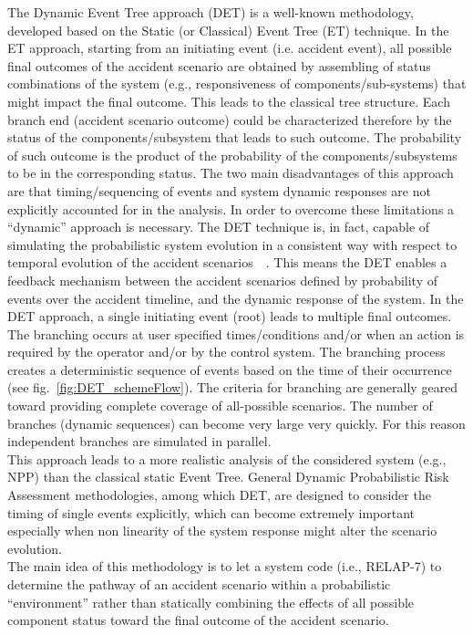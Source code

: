 \label{sec:det}
The Dynamic Event Tree approach (DET) is a well-known methodology, developed based on the Static (or Classical) Event Tree (ET) technique. In the ET approach, starting from an initiating event (i.e. accident event), all possible final outcomes of the accident scenario are obtained by assembling of status combinations of the system (e.g., responsiveness of components/sub-systems) that might impact the final outcome. This leads to the classical tree structure. Each branch end (accident scenario outcome) could be characterized therefore by the status of the components/subsystem that leads to such outcome. The probability of such outcome is the product of the probability of the components/subsystems to be in the corresponding status. The two main disadvantages of this approach are that timing/sequencing of events and system dynamic responses are not explicitly accounted for in the analysis.  
In order to overcome these limitations a “dynamic” approach is necessary. The DET technique is, in fact, capable of simulating the probabilistic system evolution in a consistent way with respect to temporal evolution of the accident scenarios~\cite{alfonsiPSA}~\cite{ADAPTHakobyan}. This means the DET enables a feedback mechanism between the accident scenarios defined by probability of events over the accident timeline, and the dynamic response of the system. In the DET approach, a single initiating event (root) leads to multiple final outcomes. The branching occurs at user specified times/conditions and/or when an action is required by the operator and/or by the control system. The branching process creates a deterministic sequence of events based on the time of their occurrence (see fig.~\ref{fig:DET_schemeFlow}). 
The criteria for branching are generally geared toward providing complete coverage of all-possible scenarios. The number of branches (dynamic sequences) can become very large very quickly. For this reason independent branches are simulated in parallel.
\\This approach leads to a more realistic analysis of the considered system (e.g., NPP) than the classical static Event Tree. General Dynamic Probabilistic Risk Assessment methodologies, among which DET, are designed to consider the timing of single events explicitly, which can become extremely important especially when non linearity of the system response might alter the scenario evolution. 
\\The main idea of this methodology is to let a system code (i.e., RELAP-7) to determine the pathway of an accident scenario within a probabilistic “environment” rather than statically combining the effects of all possible component status toward the final outcome of the accident scenario.
